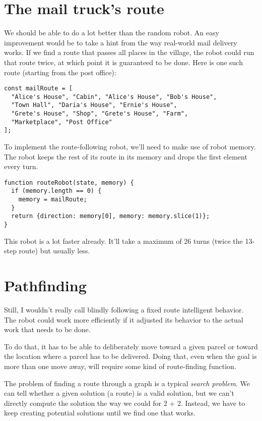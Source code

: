 \section{The mail truck's route}

We should be able to do a lot better than the random robot. An easy improvement would be to take a hint from the way real-world mail delivery works. If we find a route that passes all places in the village, the robot could run that route twice, at which point it is guaranteed to be done. Here is one such route (starting from the post office):

\begin{lstlisting}
const mailRoute = [
  "Alice's House", "Cabin", "Alice's House", "Bob's House",
  "Town Hall", "Daria's House", "Ernie's House",
  "Grete's House", "Shop", "Grete's House", "Farm",
  "Marketplace", "Post Office"
];
\end{lstlisting}
\noindent{}

To implement the route-following robot, we'll need to make use of robot memory. The robot keeps the rest of its route in its memory and drops the first element every turn.

\begin{lstlisting}
function routeRobot(state, memory) {
  if (memory.length == 0) {
    memory = mailRoute;
  }
  return {direction: memory[0], memory: memory.slice(1)};
}
\end{lstlisting}
\noindent

This robot is a lot faster already. It'll take a maximum of 26 turns (twice the 13-step route) but usually less.

\section{Pathfinding}

Still, I wouldn't really call blindly following a fixed route intelligent behavior. The robot could work more efficiently if it adjusted its behavior to the actual work that needs to be done.

To do that, it has to be able to deliberately move toward a given parcel or toward the location where a parcel has to be delivered. Doing that, even when the goal is more than one move away, will require some kind of route-finding function.

The problem of finding a route through a graph is a typical \emph{search problem}. We can tell whether a given solution (a route) is a valid solution, but we can't directly compute the solution the way we could for 2 + 2. Instead, we have to keep creating potential solutions until we find one that works.

